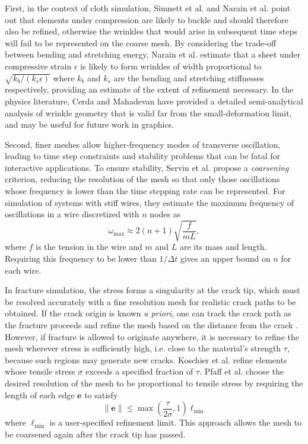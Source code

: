 First, in the context of cloth simulation, Simnett et al. \cite{Simnett2009} and Narain et al. \cite{Narain2012} point out that elements under compression are likely to buckle and should therefore also be refined, otherwise the wrinkles that would arise in subsequent time steps will fail to be represented on the coarse mesh.
By considering the trade-off between bending and stretching energy, Narain et al. estimate that a sheet under compressive strain $\epsilon$ is likely to form wrinkles of width proportional to $\sqrt{k_b/(k_s\epsilon)}$ where $k_b$ and $k_s$ are the bending and stretching stiffnesses respectively, providing an estimate of the extent of refinement necessary.
In the physics literature, Cerda and Mahadevan \cite{Cerda2003} have provided a detailed semi-analytical analysis of wrinkle geometry that is valid far from the small-deformation limit, and may be useful for future work in graphics.

Second, finer meshes allow higher-frequency modes of transverse oscillation, leading to time step constraints and stability problems that can be fatal for interactive applications.
To ensure stability, Servin et al. \cite{Servin2008} propose a \emph{coarsening} criterion, reducing the resolution of the mesh so that only those oscillations whose frequency is lower than the time stepping rate can be represented.
For simulation of systems with stiff wires, they estimate the maximum frequency of oscillations in a wire discretized with $n$ nodes as
\begin{equation}
	\omega_{\max} \approx 2(n+1)\sqrt{\frac{f}{mL}},
\end{equation}
where $f$ is the tension in the wire and $m$ and $L$ are its mass and length.
Requiring this frequency to be lower than $1/\Delta t$ gives an upper bound on $n$ for each wire.

In fracture simulation, the stress forms a singularity at the crack tip, which must be resolved accurately with a fine resolution mesh for realistic crack paths to be obtained.
If the crack origin is known \textit{a priori}, one can track the crack path as the fracture proceeds and refine the mesh based on the distance from the crack \cite{Busaryev2013}.
However, if fracture is allowed to originate anywhere, it is necessary to refine the mesh wherever stress is sufficiently high, i.e. close to the material's strength $\tau$, because such regions may generate new cracks.
Koschier et al. \cite{Koschier2014} refine elements whose tensile stress $\sigma$ exceeds a specified fraction of $\tau$.
Pfaff et al. \cite{Pfaff2014} choose the desired resolution of the mesh to be proportional to tensile stress by requiring the length of each edge $\mathbf e$ to satisfy
\begin{equation}
	\|\mathbf e\|\le\max\left(\frac{\tau}{2\sigma},1\right)\ell_{\min}
\end{equation}
where $\ell_{\min}$ is a user-specified refinement limit.
This approach allows the mesh to be coarsened again after the crack tip has passed.

